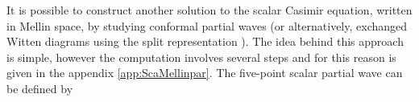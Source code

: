 It is possible to construct another solution to the scalar Casimir equation, written in Mellin space, by studying conformal partial waves (or alternatively, exchanged Witten diagrams using the split representation \cite{Costa:2014kfa}). The idea behind this approach is simple, however the computation involves several steps and for this reason is given in the appendix \ref{app:ScaMellinpar}.
The five-point scalar partial wave can be defined by 
